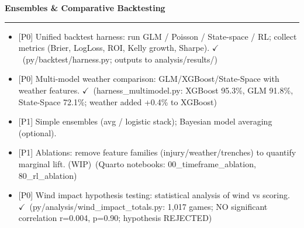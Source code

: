 \documentclass[11pt]{article}
\newcommand{\milestone}[1]{\vspace{0.5em}\noindent\textbf{\large #1}\par\vspace{0.25em}\hrule\vspace{0.5em}}
\newcommand{\done}{\textcolor{green!60!black}{\(\checkmark\)}}
\newcommand{\wip}{\textcolor{orange!80!black}{(WIP)}}
\newcommand{\prio}[1]{\textcolor{blue!70!black}{[#1]}}
\begin{document}
\milestone{Ensembles \& Comparative Backtesting}
\begin{itemize}
  \item \prio{P0} Unified backtest harness: run GLM / Poisson / State-space / RL; collect metrics (Brier, LogLoss, ROI, Kelly growth, Sharpe). \done\ (py/backtest/harness.py; outputs to analysis/results/)
  \item \prio{P0} Multi-model weather comparison: GLM/XGBoost/State-Space with weather features. \done\ (harness\_multimodel.py: XGBoost 95.3\%, GLM 91.8\%, State-Space 72.1\%; weather added +0.4\% to XGBoost)
  \item \prio{P1} Simple ensembles (avg / logistic stack); Bayesian model averaging (optional).
  \item \prio{P1} Ablations: remove feature families (injury/weather/trenches) to quantify marginal lift. \wip\ (Quarto notebooks: 00\_timeframe\_ablation, 80\_rl\_ablation)
  \item \prio{P0} Wind impact hypothesis testing: statistical analysis of wind vs scoring. \done\ (py/analysis/wind\_impact\_totals.py: 1,017 games; NO significant correlation r=0.004, p=0.90; hypothesis REJECTED)
\end{itemize}
\end{document}
